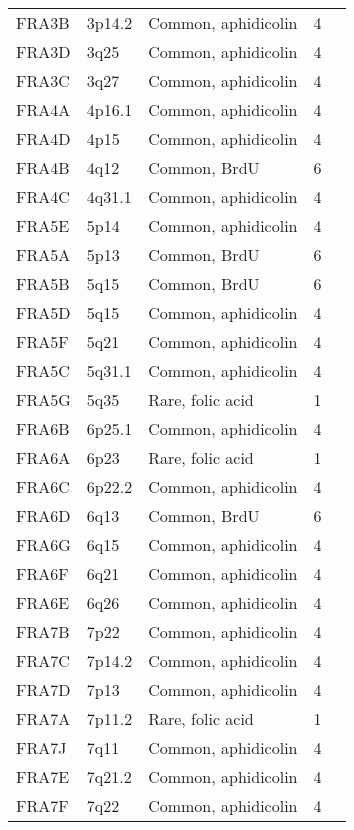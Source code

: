 \documentclass[phd,tocprelim]{cornell}
\begin{document}
\begin{table}
\begin{tabular}{l*{4}{l}}
     FRA3B  & 3p14.2   & Common, aphidicolin   & 4 \\
     FRA3D  & 3q25     & Common, aphidicolin   & 4 \\
     FRA3C  & 3q27     & Common, aphidicolin   & 4 \\
     FRA4A  & 4p16.1   & Common, aphidicolin   & 4 \\
     FRA4D  & 4p15     & Common, aphidicolin   & 4 \\
     FRA4B  & 4q12     & Common, BrdU          & 6 \\
     FRA4C  & 4q31.1   & Common, aphidicolin   & 4 \\
     FRA5E  & 5p14     & Common, aphidicolin   & 4 \\
     FRA5A  & 5p13     & Common, BrdU          & 6 \\
     FRA5B  & 5q15     & Common, BrdU          & 6 \\
     FRA5D  & 5q15     & Common, aphidicolin   & 4 \\
     FRA5F  & 5q21     & Common, aphidicolin   & 4 \\
     FRA5C  & 5q31.1   & Common, aphidicolin   & 4 \\
     FRA5G  & 5q35     & Rare, folic acid    & 1 \\
     FRA6B  & 6p25.1   & Common, aphidicolin   & 4 \\
     FRA6A  & 6p23     & Rare, folic acid    & 1 \\
     FRA6C  & 6p22.2   & Common, aphidicolin   & 4 \\
     FRA6D  & 6q13     & Common, BrdU          & 6 \\
     FRA6G  & 6q15     & Common, aphidicolin   & 4 \\
     FRA6F  & 6q21     & Common, aphidicolin   & 4 \\
     FRA6E  & 6q26     & Common, aphidicolin   & 4 \\
     FRA7B  & 7p22     & Common, aphidicolin   & 4 \\
     FRA7C  & 7p14.2   & Common, aphidicolin   & 4 \\
     FRA7D  & 7p13     & Common, aphidicolin   & 4 \\
     FRA7A  & 7p11.2   & Rare, folic acid    & 1 \\
     FRA7J  & 7q11     & Common, aphidicolin   & 4 \\
     FRA7E  & 7q21.2   & Common, aphidicolin   & 4 \\
     FRA7F  & 7q22     & Common, aphidicolin   & 4 \\

\end{tabular}
\end{table}
\end{document}
